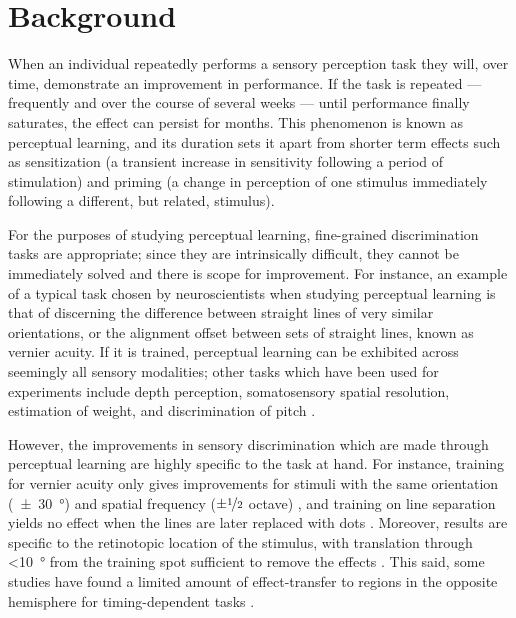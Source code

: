 \section{Background}
\label{sec:pl_bg}
\label{sec:bgpl}

When an individual repeatedly performs a sensory perception task they will, over time, demonstrate an improvement in performance.
If the task is repeated --- frequently and over the course of several weeks --- until performance finally saturates, the effect can persist for months.
This phenomenon is known as perceptual learning, and its duration sets it apart from shorter term effects such as sensitization (a transient increase in sensitivity following a period of stimulation) and priming (a change in perception of one stimulus immediately following a different, but related, stimulus).

For the purposes of studying perceptual learning, fine-grained discrimination tasks are appropriate; since they are intrinsically difficult, they cannot be immediately solved and there is scope for improvement.
For instance, an example of a typical task chosen by neuroscientists when studying perceptual learning is that of discerning the difference between straight lines of very similar orientations, or the alignment offset between sets of straight lines, known as vernier acuity.
If it is trained, perceptual learning can be exhibited across seemingly all sensory modalities; other tasks which have been used for experiments include depth perception, somatosensory spatial resolution, estimation of weight, and discrimination of pitch \citep{Gilbert1994,Gilbert2001,Dinse2003}.

However, the improvements in sensory discrimination which are made through perceptual learning are highly specific to the task at hand.
For instance, training for vernier acuity only gives improvements for stimuli with the same orientation (\SI{\pm30}{\degree}) and spatial frequency ($\pm\nicefrac{1}{2}$ octave) \citep{Fiorentini1980,Poggio1991}, and training on line separation yields no effect when the lines are later replaced with dots \citep{Poggio1992}.
Moreover, results are specific to the retinotopic location of the stimulus, with translation through \SI{<10}{\degree} from the training spot sufficient to remove the effects \citep{Fiorentini1980,Fiorentini1981,Poggio1991,Karni1991}.
This said, some studies have found a limited amount of effect-transfer to regions in the opposite hemisphere for timing-dependent tasks \citep{Ball1987,Berardi1987}.

